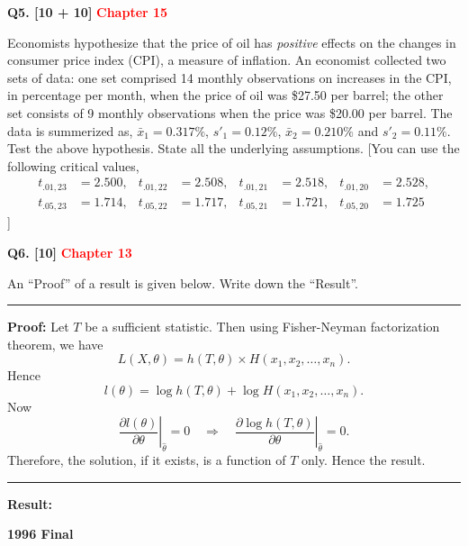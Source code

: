 \documentclass[11pt]{article}
\begin{document}
\bigskip
\textbf{Q5. [10 + 10]}  \textbf{\textcolor{red}{Chapter 15}}

Economists hypothesize that the price of oil has \emph{positive} effects on the changes in consumer price index (CPI), a measure of inflation. An economist collected two sets of data: one set comprised 14 monthly observations on increases in the CPI, in percentage per month, when the price of oil was \$27.50 per barrel; the other set consists of 9 monthly observations when the price was \$20.00 per barrel. The data is summerized as, $\bar{x}_1=0.317\%$, $s'_1=0.12\%$, $\bar{x}_2=0.210\%$ and $s'_2=0.11\%$. Test the above hypothesis. State all the underlying assumptions. [You can use the following critical values,
\[
\begin{aligned}
t_{.01,23}&=2.500,& t_{.01,22}&=2.508,&t_{.01,21}&=2.518,&t_{.01,20}&=2.528,\\
t_{.05,23}&=1.714,& t_{.05,22}&=1.717,&t_{.05,21}&=1.721,&t_{.05,20}&=1.725
\end{aligned}
\]
]

\bigskip
\textbf{Q6. [10]}  \textbf{\textcolor{red}{Chapter 13}}

An ``Proof'' of a result is given below. Write down the ``Result''.

\medskip
\hrule
\medskip

\textbf{Proof:} Let $T$ be a sufficient statistic. Then using Fisher-Neyman factorization theorem, we have
\[
L(X,\theta)=h(T,\theta)\times H(x_1,x_2,\ldots,x_n).
\]
Hence
\[
l(\theta)=\log h(T,\theta)+\log H(x_1,x_2,\ldots,x_n).
\]
Now
\[
\left.\frac{\partial l(\theta)}{\partial\theta}\right|_{\hat\theta}=0
\quad\Rightarrow\quad
\left.\frac{\partial\log h(T,\theta)}{\partial\theta}\right|_{\hat\theta}=0.
\]
Therefore, the solution, if it exists, is a function of $T$ only. Hence the result.

\medskip
\hrule
\medskip
\textbf{Result:}



\clearpage

\begin{center}
    {\Large\bfseries 1996 Final}
\end{center}
\end{document}
